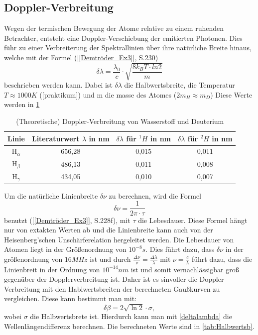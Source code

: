 \subsection{Doppler-Verbreitung}

Wegen der termischen Bewegung der Atome relative zu einem ruhenden Betrachter, entsteht eine Doppler-Verschiebung der emitierten Photonen. 
Dies führ zu einer Verbreiterung der Spektrallinien über ihre natürliche Breite hinaus, welche mit der Formel (\cref{[Demtröder_Ex3]}, S.230)
\begin{equation}
    \delta\lambda = \frac{\lambda_0}{c}\cdot \sqrt{\frac{8k_BT\cdot ln2}{m}}
\end{equation}
beschrieben werden kann.
Dabei ist $\delta\lambda$ die Halbwertsbreite, die Temperatur $T \approx 1000K$ ([praktikum]) und m die masse des Atomes (2$m_H \approx m_D$)
Diese Werte werden in \cref{tab:dopplerTemp}
\begin{table}[htbp]
    \centering
    \begin{tabular}{|c|c|c|c|}
    \hline
    Linie & Literaturwert $\lambda$ in nm & $\delta\lambda$ für $^1H$ in nm & $\delta\lambda$ für $^2H$ in nm \\
    \midrule
    H$_\alpha$ & 656,28 & 0,015 & 0,011 \\
    H$_\beta$ & 486,13 & 0,011 & 0,008 \\
    H$_\gamma$  & 434,05 & 0,010 & 0,007 \\
    \hline
    \end{tabular}
    \caption{(Theoretische) Doppler-Verbreitung von Wasserstoff und Deuterium}
    \label{tab:dopplerTemp}
\end{table}

Um die natürliche Linienbreite $\delta\nu$ zu berechnen, wird die Formel
\begin{equation}
    \delta \nu = \frac{1}{2\pi \cdot \tau}
\end{equation}
benutzt (\cref{[Demtröder_Ex3]}, S.228f), mit $\tau$ die Lebesdauer. 
Diese Formel hängt nur von extakten Werten ab und die Linienbreite kann auch von der Heisenberg'schen Unschärferelation hergeleitet werden.  
Die Lebesdauer von Atomen liegt in der Größenordnung von $10^{-8}s$. 
Dies führt dazu, dass $\delta\nu$ in der größenordnung von $16MHz$  ist und durch $\frac{\Delta\nu}{\nu} = \frac{\Delta\lambda}{\lambda}$ mit $\nu = \frac{c}{\lambda}$ führt dazu, dass die Linienbreit in der Ordnung von $10^{-14}nm$ ist und somit vernachlässigbar groß gegenüber der Dopplerverbreitung ist.
Daher ist es sinvoller die Doppler-Verbreitung mit den Hablwertsbreiten der berechneten Gaußkurven zu vergleichen.
Diese kann bestimmt man mit:
\begin{equation}
    \delta\beta = 2\sqrt{\ln{2}}\cdot \sigma,
\end{equation}
wobei $\sigma$ die Halbwertsbrete ist.
Hierdurch kann man mit \cref{deltalambda} die Wellenlängendifferenz berechnen.
Die berechneten Werte sind in \cref{tab:Halbwertsb}.


